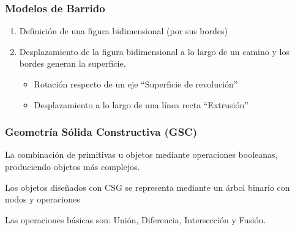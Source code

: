 \subsubsection{Modelos de Barrido}
\begin{enumerate}
    \item Definición de una figura bidimensional (por sus bordes)
    \item Desplazamiento de la figura bidimensional a lo largo de un camino y los bordes generan la superficie.
    \begin{itemize}
        \item Rotación respecto de un eje “Superficie de revolución” 
        \item Desplazamiento a lo largo de una línea recta “Extrusión”
    \end{itemize}
\end{enumerate}
\subsubsection{Geometría Sólida Constructiva (GSC)}
La combinación de primitivas u objetos mediante operaciones booleanas, produciendo objetos más complejos. 

Los objetos diseñados con CSG se representa mediante un árbol binario con nodos y operaciones 

Las operaciones básicas son: Unión, Diferencia, Intersección y Fusión.
